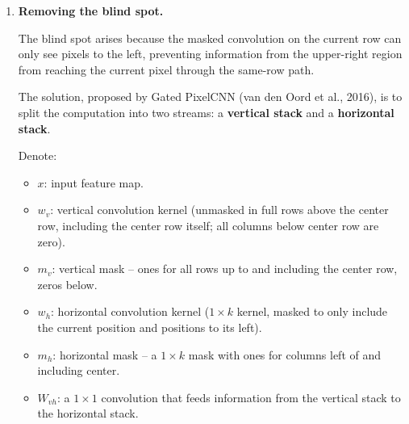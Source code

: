 \documentclass{article}
\begin{document}
{\begin{enumerate}
        \textbf{General pattern after $n$ layers:} The asymmetry accumulates with depth. The right boundary of the RF exhibits a \textbf{sawtooth} (staircase) shape:
        \begin{itemize}
            \item On \emph{upper rows} of the mask ($h = 2$ rows at a time for a $5\times 5$ kernel), the right boundary remains \emph{flat} (same rightward extent) for $h$ consecutive rows, forming a ``tooth.''
            \item Then it \emph{drops} by $h$ columns as we move down to the next group of rows.
            \item On the \emph{current row}, the right boundary is far to the left of center, since information on the same row can only propagate leftward.
        \end{itemize}

        This periodic pattern of ``flat plateau $\to$ step down $\to$ flat plateau $\to$ step down'' is the characteristic sawtooth shape shown in Figure~1a. The upper-right region that is never covered by the RF constitutes the \textbf{blind spot}.

        \item \textbf{Removing the blind spot.}

        The blind spot arises because the masked convolution on the current row can only see pixels to the left, preventing information from the upper-right region from reaching the current pixel through the same-row path.

        The solution, proposed by Gated PixelCNN (van den Oord et al., 2016), is to split the computation into two streams: a \textbf{vertical stack} and a \textbf{horizontal stack}.

        Denote:
        \begin{itemize}
            \item $x$: input feature map.
            \item $w_v$: vertical convolution kernel (unmasked in full rows above the center row, including the center row itself; all columns below center row are zero).
            \item $m_v$: vertical mask -- ones for all rows up to and including the center row, zeros below.
            \item $w_h$: horizontal convolution kernel ($1 \times k$ kernel, masked to only include the current position and positions to its left).
            \item $m_h$: horizontal mask -- a $1 \times k$ mask with ones for columns left of and including center.
            \item $W_{vh}$: a $1 \times 1$ convolution that feeds information from the vertical stack to the horizontal stack.
        \end{itemize}


\end{enumerate}}
\end{document}

